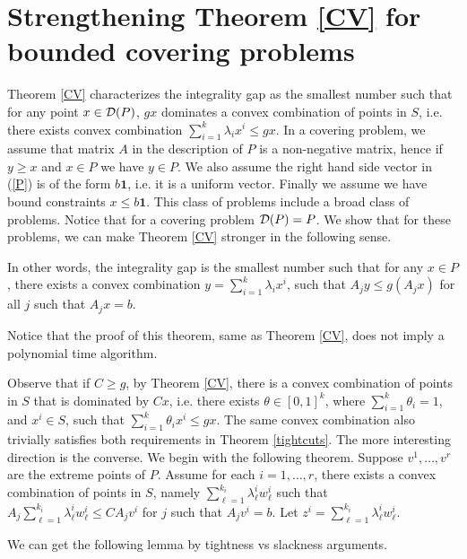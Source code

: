 \section{Strengthening Theorem \ref{CV} for bounded covering problems} \label{gap}

Theorem \ref{CV} characterizes the integrality gap as the smallest number such that for any point $x\in \operatorname{\mathcal{D}}(P)$, $gx$ dominates a convex combination of points in $S$, i.e. there exists convex combination $\sum_{i=1}^{k}\lambda_ix^i \leq gx$.  In a covering problem, we assume that matrix $A$ in the description of $P$ is a non-negative matrix, hence if $y\geq x$ and $x\in P$ we have $y\in P$. We also assume the right hand side vector in (\ref{P}) is of the form $b\textbf{1}$, i.e. it is a uniform vector. Finally we assume we have bound constraints $x\leq b\textbf{1}$. This class of problems include a broad class of problems. Notice that for a covering problem $\operatorname{\mathcal{D}}(P)=P$.  We show that for these problems, we can make Theorem \ref{CV} stronger in the following sense. 

\tightcuts*

In other words, the integrality gap is the smallest number such that for any $x\in P$, there exists a convex combination $y=\sum_{i=1}^{k}\lambda_ix^i$, such that $A_jy\leq g(A_jx)$ for all $j$ such that $A_jx=b$. 

Notice that the proof of this theorem, same as Theorem \ref{CV}, does not imply a polynomial time algorithm.

Observe that if $C\geq g$, by Theorem \ref{CV}, there is a convex combination of points in $S$ that is dominated by $Cx$, i.e. there exists $\theta\in [0,1]^{k}$, where $\sum_{i=1}^{k}\theta_i=1$, and $x^i\in S$, such that $\sum_{i=1}^{k}\theta_ix^i\leq gx$. The same convex combination also trivially satisfies both requirements in Theorem \ref{tightcuts}. The more interesting direction is the converse. We begin with the following theorem. Suppose $v^1,\ldots,v^r$ are the extreme points of $P$. Assume for each $i=1,\ldots,r$, there exists a convex combination of points in $S$, namely $\sum_{\ell=1}^{k_i} \lambda^i_\ell w^i_\ell$ such that $A_j \sum_{\ell=1}^{k_i} \lambda^i_\ell w^i_\ell \leq CA_jv^i$ for $j$ such that $A_jv^i = b$. Let $z^i = \sum_{\ell=1}^{k_i} \lambda^i_\ell w^i_\ell$.



We can get the following lemma by tightness vs slackness arguments. 

